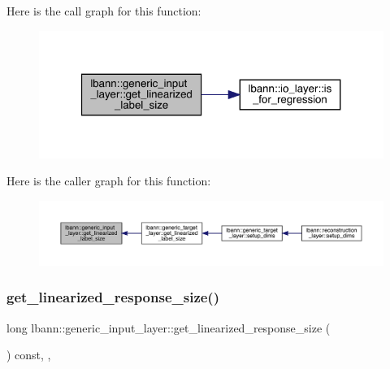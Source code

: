 Here is the call graph for this function\+:\nopagebreak
\begin{figure}[H]
\begin{center}
\leavevmode
\includegraphics[width=321pt]{classlbann_1_1generic__input__layer_ab6c24db7e2b8e73e7d7894e51246dc5e_cgraph}
\end{center}
\end{figure}
Here is the caller graph for this function\+:\nopagebreak
\begin{figure}[H]
\begin{center}
\leavevmode
\includegraphics[width=350pt]{classlbann_1_1generic__input__layer_ab6c24db7e2b8e73e7d7894e51246dc5e_icgraph}
\end{center}
\end{figure}
\mbox{\label{classlbann_1_1generic__input__layer_a6e5e587aa5b32bdfd2dd579a2746885d}} 
\subsubsection{\texorpdfstring{get\+\_\+linearized\+\_\+response\+\_\+size()}{get\_linearized\_response\_size()}}
{\footnotesize\ttfamily long lbann\+::generic\+\_\+input\+\_\+layer\+::get\+\_\+linearized\+\_\+response\+\_\+size (\begin{DoxyParamCaption}{ }\end{DoxyParamCaption}) const\hspace{0.3cm}{\ttfamily [inline]}, {\ttfamily [override]}, {\ttfamily [virtual]}}




